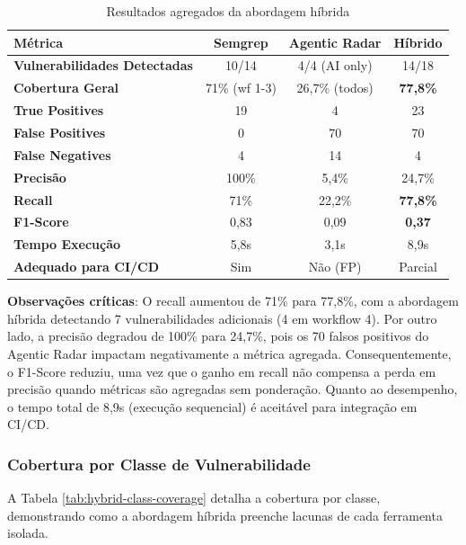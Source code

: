 \documentclass[12pt,a4paper]{article}
\begin{document}
\begin{table}[H]
\centering
\caption{Resultados agregados da abordagem híbrida}
\label{tab:hybrid-results}
\begin{tabular}{@{}lccc@{}}
\toprule
\textbf{Métrica} & \textbf{Semgrep} & \textbf{Agentic Radar} & \textbf{Híbrido} \\ \midrule
\textbf{Vulnerabilidades Detectadas} & 10/14 & 4/4 (AI only) & 14/18 \\
\textbf{Cobertura Geral} & 71\% (wf 1-3) & 26,7\% (todos) & \textbf{77,8\%} \\
\textbf{True Positives} & 19 & 4 & 23 \\
\textbf{False Positives} & 0 & 70 & 70 \\
\textbf{False Negatives} & 4 & 14 & 4 \\
\textbf{Precisão} & 100\% & 5,4\% & 24,7\% \\
\textbf{Recall} & 71\% & 22,2\% & \textbf{77,8\%} \\
\textbf{F1-Score} & 0,83 & 0,09 & \textbf{0,37} \\
\textbf{Tempo Execução} & 5,8s & 3,1s & 8,9s \\
\textbf{Adequado para CI/CD} & Sim & Não (FP) & Parcial \\ \bottomrule
\end{tabular}
\end{table}

\textbf{Observações críticas}: O recall aumentou de 71\% para 77,8\%, com a abordagem híbrida detectando 7 vulnerabilidades adicionais (4 em workflow 4). Por outro lado, a precisão degradou de 100\% para 24,7\%, pois os 70 falsos positivos do Agentic Radar impactam negativamente a métrica agregada. Consequentemente, o F1-Score reduziu, uma vez que o ganho em recall não compensa a perda em precisão quando métricas são agregadas sem ponderação. Quanto ao desempenho, o tempo total de 8,9s (execução sequencial) é aceitável para integração em CI/CD.

\subsubsection{Cobertura por Classe de Vulnerabilidade}

A Tabela \ref{tab:hybrid-class-coverage} detalha a cobertura por classe, demonstrando como a abordagem híbrida preenche lacunas de cada ferramenta isolada.
\end{document}
